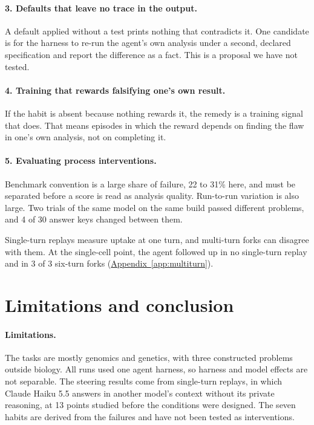 \documentclass[10pt]{article}
\newcommand{\aref}[1]{\hyperref[#1]{Appendix~\ref*{#1}}}
\begin{document}
\paragraph{3. Defaults that leave no trace in the output.} A default applied without a test prints nothing that contradicts it. One candidate is
for the harness to re-run the agent's own analysis under a second, declared specification and report the difference as a fact. This is a proposal
we have not tested.

\paragraph{4. Training that rewards falsifying one's own result.} If the habit is absent because nothing rewards it, the remedy is a training signal
that does. That means episodes in which the reward depends on finding the flaw in one's own analysis, not on completing it.

\paragraph{5. Evaluating process interventions.} Benchmark convention is a large share of failure, 22 to 31\% here, and must be separated before a
score is read as analysis quality. Run-to-run variation is also large. Two trials of the same model on the same build passed different problems,
and 4 of 30 answer keys changed between them.

Single-turn replays measure uptake at one turn, and multi-turn forks can disagree with them. At the single-cell point, the agent followed up in no
single-turn replay and in 3 of 3 six-turn forks (\aref{app:multiturn}).

\section{Limitations and conclusion}\label{sec:limits}

\paragraph{Limitations.} The tasks are mostly genomics and genetics, with three constructed problems outside biology. All runs used one agent
harness, so harness and model effects are not separable. The steering results come from single-turn replays, in which Claude Haiku 5.5 answers in
another model's context without its private reasoning, at 13 points studied before the conditions were designed. The seven habits are derived from
the failures and have not been tested as interventions.
\end{document}
